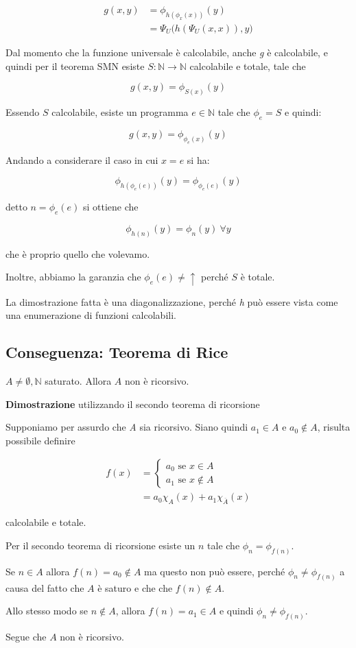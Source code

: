 \begin{align*}
g(x,y) &= \phi_{h(\phi_x(x))}(y) \\
			&= \Psi_U\big( h(\Psi_U(x,x)), y \big)
\end{align*}

Dal momento che la funzione universale è calcolabile, anche \textit{g} è calcolabile, e quindi per il teorema SMN esiste $S : \mathbb{N} \rightarrow \mathbb{N}$ calcolabile e totale, tale che

$$
g(x,y) = \phi_{S(x)}(y)
$$

Essendo $S$ calcolabile, esiste un programma $e \in \mathbb{N}$ tale che $\phi_e = S$ e quindi:

$$
g(x,y) = \phi_{\phi_e(x)}(y)
$$

Andando a considerare il caso in cui $x = e$ si ha:

$$
\phi_{h(\phi_e(e))}(y) = \phi_{\phi_e(e)}(y)
$$

detto $n = \phi_e(e)$ si ottiene che 

$$
\phi_{h(n)}(y) = \phi_n(y) \: \forall y
$$

che è proprio quello che volevamo.

Inoltre, abbiamo la garanzia che $\phi_e(e) \neq \uparrow$ perché $S$ è totale.

La dimostrazione fatta è una diagonalizzazione, perché \textit{h} può essere vista come una enumerazione di funzioni calcolabili.

\subsection{Conseguenza: Teorema di Rice}

$A \neq \emptyset , \mathbb{N}$ saturato. Allora $A$ non è ricorsivo.

\textbf{Dimostrazione} utilizzando il secondo teorema di ricorsione

Supponiamo per assurdo che \textit{A} sia ricorsivo. Siano quindi $a_1 \in A$ e $a_0 \notin A$, risulta possibile definire

\begin{align*}
f(x) &= \begin{cases}
	a_0 \text{ se } x \in A \\
	a_1 \text{ se } x \notin A
\end{cases} \\
& = a_0 \chi_{A}(x) + a_1 \chi_{\overline{A}}(x)
\end{align*}

calcolabile e totale.

Per il secondo teorema di ricorsione esiste un $n$ tale che $\phi_n = \phi_{f(n)}$.

Se $n \in A$ allora $f(n) = a_0 \notin A$ ma questo non può essere, perché $\phi_n \neq \phi_{f(n)}$ a causa del fatto che $A$ è saturo e che che $f(n) \notin A$.

Allo stesso modo se $n \notin A$, allora $f(n) = a_1 \in A$ e quindi $\phi_n \neq \phi_{f(n)}$.

Segue che $A$ non è ricorsivo.
